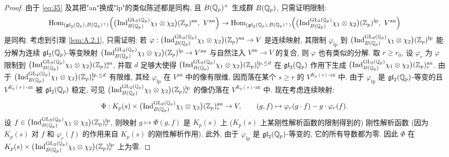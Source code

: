 \begin{proof}
由于 \eqref{eq:35} 及其把"an"换成"lp"的类似陈述都是同构, 且 $B(\mathbb{Q}_p)^{+}$ 生成群 $B(\mathbb{Q}_p)$, 只需证明限制:
\begin{equation}
\label{eq:39}
\Hom_{(\mathfrak{gl}_2(\Qp),B(\Qp)^{+})}\Bigl(\bigl(\pind{}_{B(\Qp)}^{\GL_2(\Qp)} \chi_1 \otimes \chi_2\bigr)(\Zp)^{\mathrm{an}},\ V^{\mathrm{an}}\Bigr)
\to \Hom_{(\mathfrak{gl}_2(\Qp),B(\Qp)^{+})}\Bigl(\bigl(\pind{}_{B(\Qp)}^{\GL_2(\Qp)} \chi_1 \otimes \chi_2\bigr)(\Zp)^{\mathrm{lp}},\ V^{\mathrm{an}}\Bigr)
\end{equation}
是同构.
考虑到引理 \ref{lem:A.2.1}, 只需证明: 若 $\varphi : \bigl(\prescript{}{}{\mathrm{Ind}}_{B(\mathbb{Q}_p)}^{\mathrm{GL}_2(\mathbb{Q}_p)} \chi_1 \otimes \chi_2\bigr)(\mathbb{Z}_p)^{\mathrm{an}} \to V$ 是连续映射, 其限制 $\varphi_{\mathrm{lp}}$ 到 $\bigl(\prescript{}{}{\mathrm{Ind}}_{B(\mathbb{Q}_p)}^{\mathrm{GL}_2(\mathbb{Q}_p)} \chi_1 \otimes \chi_2\bigr)(\mathbb{Z}_p)^{\mathrm{lp}}$ 能分解为连续 $\mathfrak{gl}_2(\mathbb{Q}_p)$-等变映射 $\bigl(\prescript{}{}{\mathrm{Ind}}_{B(\mathbb{Q}_p)}^{\mathrm{GL}_2(\mathbb{Q}_p)} \chi_1 \otimes \chi_2\bigr)(\mathbb{Z}_p)^{\mathrm{lp}} \to V^{\mathrm{an}}$ 与自然注入 $V^{\mathrm{an}} \to V$ 的复合, 则 $\varphi$ 也有类似的分解.
取 $r \ge r_0$, 设 $\varphi_r$ 为 $\varphi$ 限制到 $\bigl(\prescript{}{}{\mathrm{Ind}}_{B(\mathbb{Q}_p)}^{\mathrm{GL}_2(\mathbb{Q}_p)} \chi_1 \otimes \chi_2\bigr)(\mathbb{Z}_p)^{\mathrm{an}}_{r}$, 并取 $d$ 足够大使得 $\bigl(\prescript{}{}{\mathrm{Ind}}_{B(\mathbb{Q}_p)}^{\mathrm{GL}_2(\mathbb{Q}_p)} \chi_1 \otimes \chi_2\bigr)(\mathbb{Z}_p)^{\mathrm{lp},\le d}_{r}$ 在 $\mathfrak{gl}_2(\mathbb{Q}_p)$ 作用下生成 $\bigl(\prescript{}{}{\mathrm{Ind}}_{B(\mathbb{Q}_p)}^{\mathrm{GL}_2(\mathbb{Q}_p)} \chi_1 \otimes \chi_2\bigr)(\mathbb{Z}_p)^{\mathrm{an}}_{r}$.
由于 $\bigl(\prescript{}{}{\mathrm{Ind}}_{B(\mathbb{Q}_p)}^{\mathrm{GL}_2(\mathbb{Q}_p)} \chi_1 \otimes \chi_2\bigr)(\mathbb{Z}_p)^{\mathrm{lp},\le d}_{r}$ 有限维, 其经 $\varphi_{\mathrm{lp}}$ 在 $V^{\mathrm{an}}$ 中的像有限维, 因而落在某个 $s \ge r$ 的 $V^{K_p(s)\text{-an}}$ 中.
由于 $\varphi_{\mathrm{lp}}$ 是 $\mathfrak{gl}_2(\mathbb{Q}_p)$-等变的且 $V^{K_p(s)\text{-an}}$ 被 $\mathfrak{gl}_2(\mathbb{Q}_p)$ 稳定, 可见 $\bigl(\prescript{}{}{\mathrm{Ind}}_{B(\mathbb{Q}_p)}^{\mathrm{GL}_2(\mathbb{Q}_p)} \chi_1 \otimes \chi_2\bigr)(\mathbb{Z}_p)^{\mathrm{lp}}_{r}$ 的像仍落在 $V^{K_p(s)\text{-an}}$ 中.
现在考虑连续映射:
\[
\Phi : K_p(s) \times \bigl(\prescript{}{}{\mathrm{Ind}}_{B(\mathbb{Q}_p)}^{\mathrm{GL}_2(\mathbb{Q}_p)} \chi_1 \otimes \chi_2\bigr)(\mathbb{Z}_p)^{\mathrm{an}}_{r} \to V,
\qquad (g,f) \mapsto \varphi_r(g \cdot f) - g \cdot \varphi_r(f).
\]
设 $f \in \bigl(\prescript{}{}{\mathrm{Ind}}_{B(\mathbb{Q}_p)}^{\mathrm{GL}_2(\mathbb{Q}_p)} \chi_1 \otimes \chi_2\bigr)(\mathbb{Z}_p)^{\mathrm{lp}}_{r}$, 则映射 $g \mapsto \Phi(g,f)$ 是 $K_p(s)$ 上 ($K_p(s)$ 上某刚性解析函数的限制得到的) 刚性解析函数 (因为 $K_p(s)$ 对 $f$ 和 $\varphi_r(f)$ 的作用来自 $K_p(s)$ 的刚性解析作用).
此外, 由于 $\varphi_{\mathrm{lp}}$ 是 $\mathfrak{gl}_2(\mathbb{Q}_p)$-等变的, 它的所有导数都为零.
因此 $\Phi$ 在 $K_p(s) \times \bigl(\prescript{}{}{\mathrm{Ind}}_{B(\mathbb{Q}_p)}^{\mathrm{GL}_2(\mathbb{Q}_p)} \chi_1 \otimes \chi_2\bigr)(\mathbb{Z}_p)^{\mathrm{lp}}_{r}$ 上为零.

\end{proof}
